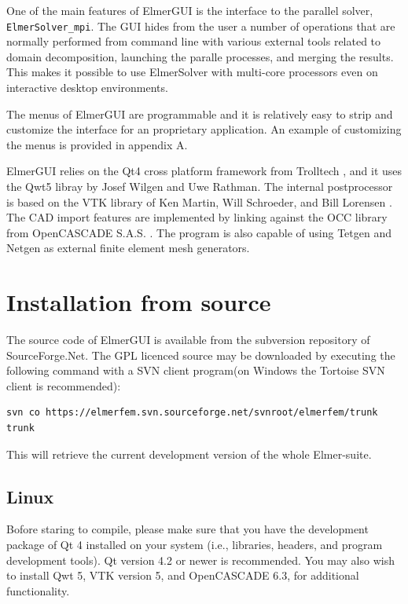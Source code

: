 \documentclass[a4paper,12pt]{article}
\begin{document}
One of the main features of ElmerGUI is the interface to the parallel solver,  {\tt ElmerSolver\_mpi}.
The GUI hides from the user a number of operations that are normally performed from command line with various external tools related to domain decomposition, launching the paralle processes, and merging the results. This makes it possible to use ElmerSolver with multi-core processors even on interactive desktop
environments.

The menus of ElmerGUI are programmable and it is relatively easy to strip and customize the interface
for an proprietary application. An example of customizing the menus is provided in appendix A.

ElmerGUI relies on the Qt4 cross platform framework from Trolltech \cite{QtHome}, and it uses the Qwt5
libray by Josef Wilgen and Uwe Rathman\cite{QwtHome}. The internal postprocessor is based on the VTK  library of Ken Martin, Will Schroeder, and Bill Lorensen \cite{VTKHome}. The CAD import features are
implemented by linking against the OCC library from OpenCASCADE S.A.S. \cite{OCCHome}. The program is
also capable of using Tetgen \cite{TetgenHome} and Netgen \cite{NetgenHome} as external finite element
mesh generators.

\section{Installation from source}

The source code of ElmerGUI is available from the subversion repository of SourceForge.Net. The GPL
licenced source may be downloaded by executing the following command with a SVN client program(on
Windows the Tortoise SVN client is recommended):

\begin{footnotesize}
\begin{verbatim}
svn co https://elmerfem.svn.sourceforge.net/svnroot/elmerfem/trunk trunk
\end{verbatim}
\end{footnotesize}
\noindent This will retrieve the current development version of the whole Elmer-suite.

\subsection{Linux}

Bofore staring to compile, please make sure that you have the development package of Qt 4
installed on your system (i.e., libraries, headers, and program development tools). Qt version 4.2
or newer is recommended. You may also wish to install Qwt 5, VTK version 5, and OpenCASCADE 6.3, 
for additional functionality.
\end{document}
